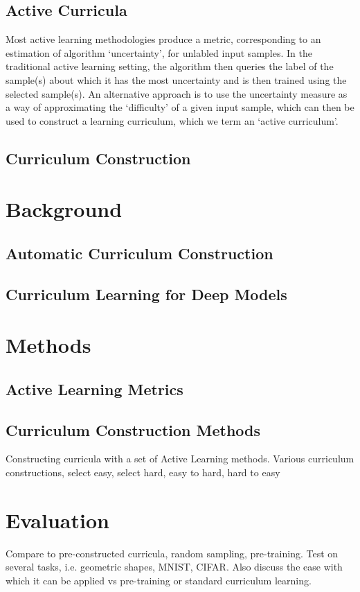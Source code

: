 \documentclass[a4paper,11pt]{article}
\begin{document}
\subsection{Active Curricula}
Most active learning methodologies produce a metric, corresponding to an estimation of algorithm `uncertainty', for unlabled input samples. In the traditional active learning setting, the algorithm then queries the label of the sample(s) about which it has the most uncertainty and is then trained using the selected sample(s). An alternative approach is to use the uncertainty measure as a way of approximating the `difficulty' of a given input sample, which can then be used to construct a learning curriculum, which we term an `active curriculum'.

\subsection{Curriculum Construction}

\section{Background}
\subsection{Automatic Curriculum Construction}

\subsection{Curriculum Learning for Deep Models}

\section{Methods}
\subsection{Active Learning Metrics}

\subsection{Curriculum Construction Methods}


Constructing curricula with a set of Active Learning methods. 
Various curriculum constructions, select easy, select hard, easy to hard, hard to easy

\section{Evaluation}
Compare to pre-constructed curricula, random sampling, pre-training.
Test on several tasks, i.e. geometric shapes, MNIST, CIFAR.
Also discuss the ease with which it can be applied vs pre-training or standard curriculum learning.
\end{document}
